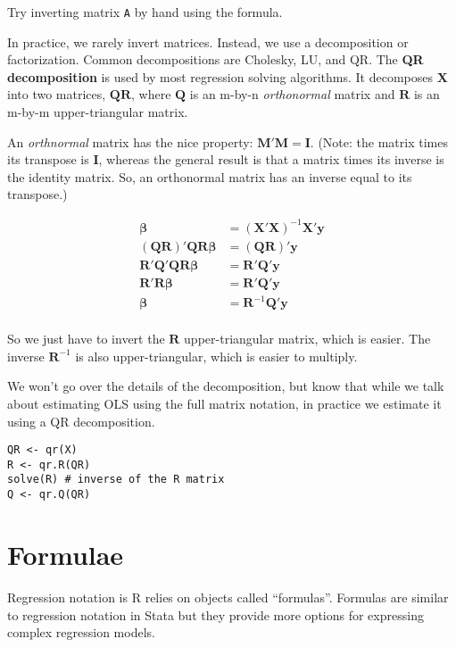 \documentclass[a4paper,12pt]{article}
\newcommand{\matr}[1]{\mathbf{#1}}
\begin{document}
Try inverting matrix \texttt{A} by hand using the formula.


In practice, we rarely invert matrices. Instead, we use a decomposition or factorization. Common decompositions are Cholesky, LU, and QR. The \textbf{QR decomposition} is used by most regression solving algorithms. It decomposes $\matr{X}$ into two matrices, $\matr{Q}\matr{R}$, where $\matr{Q}$ is an m-by-n \textit{orthonormal} matrix and $\matr{R}$ is an m-by-m upper-triangular matrix.

An \textit{orthnormal} matrix has the nice property: $\matr{M}'\matr{M} = \matr{I}$. (Note: the matrix times its transpose is $\matr{I}$, whereas the general result is that a matrix times its inverse is the identity matrix. So, an orthonormal matrix has an inverse equal to its transpose.)

\begin{align*}
\matr{\beta} & = (\matr{X}'\matr{X})^{-1}\matr{X}'\matr{y} \\
(\matr{Q}\matr{R})'\matr{Q}\matr{R}\matr{\beta} & = (\matr{Q}\matr{R})'\matr{y} \\
\matr{R}'\matr{Q}'\matr{Q}\matr{R}\matr{\beta} & = \matr{R}'\matr{Q}'\matr{y} \\
\matr{R}'\matr{R}\matr{\beta} & = \matr{R}'\matr{Q}'\matr{y} \\
\matr{\beta} & = \matr{R}^{-1}\matr{Q}'\matr{y}\\
\end{align*}

So we just have to invert the $\matr{R}$ upper-triangular matrix, which is easier. The inverse $\matr{R}^{-1}$ is also upper-triangular, which is easier to multiply.

We won't go over the details of the decomposition, but know that while we talk about estimating OLS using the full matrix notation, in practice we estimate it using a QR decomposition.


\begin{lstlisting}
QR <- qr(X)
R <- qr.R(QR)
solve(R) # inverse of the R matrix
Q <- qr.Q(QR)
\end{lstlisting}


\clearpage
\section{Formulae}


Regression notation is R relies on objects called ``formulas''. Formulas are similar to regression notation in Stata but they provide more options for expressing complex regression models.
\end{document}
